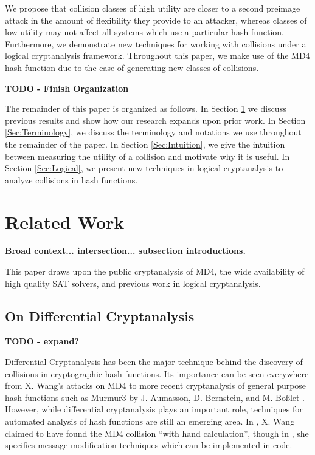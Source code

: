 \documentclass[conference]{IEEEtran}
\begin{document}
We propose that collision classes of high utility are closer to a second
preimage attack in the amount of flexibility they provide to an attacker,
whereas classes of low utility may not affect all systems which use a
particular hash function. Furthermore, we demonstrate new techniques for
working with collisions under a logical cryptanalysis framework. Throughout
this paper, we make use of the MD4 hash function due to the ease of generating
new classes of collisions.

\textbf{TODO - Finish Organization}

The remainder of this paper is organized as follows. In Section
\ref{Sec:Related} we discuss previous results and show how our research
expands upon prior work. In Section \ref{Sec:Terminology}, we discuss the
terminology and notations we use throughout the remainder of the paper.
In Section \ref{Sec:Intuition}, we give the intuition between measuring
the utility of a collision and motivate why it is useful. In Section
\ref{Sec:Logical}, we present new techniques in logical cryptanalysis to
analyze collisions in hash functions.






\section{Related Work} \label{Sec:Related}

\textbf{Broad context... intersection... subsection introductions.}

This paper draws upon the public cryptanalysis of MD4, the wide availability of
high quality SAT solvers, and previous work in logical cryptanalysis.

\subsection{On Differential Cryptanalysis}

\textbf{TODO - expand?}

Differential Cryptanalysis has been the major technique behind the discovery
of collisions in cryptographic hash functions. Its importance can be seen
everywhere from X. Wang's attacks on MD4 \cite{Wang2005} to more recent
cryptanalysis of general purpose hash functions such as Murmur3 by
J. Aumasson, D. Bernstein, and M. Bo{\ss}let \cite{murmur3DC}. However, while
differential cryptanalysis plays an important role, techniques for automated
analysis of hash functions are still an emerging area. In
\cite{cryptoeprint:2004:199}, X. Wang claimed to have found the MD4 collision
``with hand calculation'', though in \cite{Wang2005}, she specifies message
modification techniques which can be implemented in code.
\end{document}
